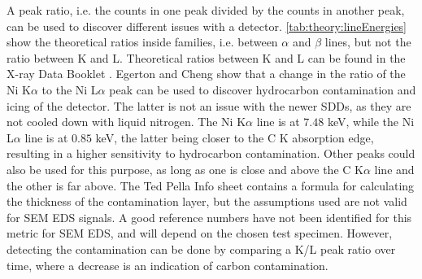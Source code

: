 A peak ratio, i.e. the counts in one peak divided by the counts in another peak, can be used to discover different issues with a detector.
\cref{tab:theory:lineEnergies} show the theoretical ratios inside families, i.e. between $\alpha$ and $\beta$ lines, but not the ratio between K and L.
Theoretical ratios between K and L can be found in the X-ray Data Booklet \cite{thompson_x-ray_2004}.
Egerton and Cheng \cite{egerton_nio_characterization_1994} show that a change in the ratio of the Ni K$\alpha$ to the Ni L$\alpha$ peak can be used to discover hydrocarbon contamination and icing of the detector.
The latter is not an issue with the newer SDDs, as they are not cooled down with liquid nitrogen.
The Ni K$\alpha$ line is at $7.48$ keV, while the Ni L$\alpha$ line is at 0$.85$ keV, the latter being closer to the C K absorption edge, resulting in a higher sensitivity to hydrocarbon contamination.
Other peaks could also be used for this purpose, as long as one is close and above the C K$\alpha$ line and the other is far above.
The Ted Pella Info sheet \cite{ted_pella_nio_tem_2019} contains a formula for calculating the thickness of the contamination layer, but the assumptions used are not valid for SEM EDS signals.
A good reference numbers have not been identified for this metric for SEM EDS, and will depend on the chosen test specimen.
However, detecting the contamination can be done by comparing a K/L peak ratio over time, where a decrease is an indication of carbon contamination.


